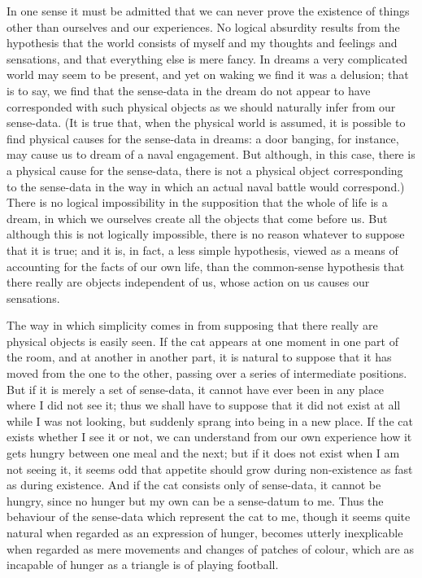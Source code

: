 \documentclass[oneside,letterpaper,12pt]{book}
\begin{document}
In one sense it must be admitted that we can never prove the existence
of things other than ourselves and our experiences. No logical absurdity
results from the hypothesis that the world consists of myself and my
thoughts and feelings and sensations, and that everything else is mere
fancy. In dreams a very complicated world may seem to be present, and
yet on waking we find it was a delusion; that is to say, we find that
the sense-data in the dream do not appear to have corresponded with such
physical objects as we should naturally infer from our sense-data. (It
is true that, when the physical world is assumed, it is possible to find
physical causes for the sense-data in dreams: a door banging, for
instance, may cause us to dream of a naval engagement. \label{navy} But although, in
this case, there is a physical cause for the sense-data, there is not a
physical object corresponding to the sense-data in the way in which an
actual naval battle would correspond.) There is no logical impossibility
in the supposition that the whole of life is a dream, in which we
ourselves create all the objects that come before us. But although this
is not logically impossible, there is no reason whatever to suppose that
it is true; and it is, in fact, a less simple hypothesis, viewed as a
means of accounting for the facts of our own life, than the common-sense
hypothesis that there really are objects independent of us, whose action
on us causes our sensations.

The way in which simplicity comes in from supposing that there really
are physical objects is easily seen. \label{kitty} If the cat appears at one moment in
one part of the room, and at another in another part, it is natural to
suppose that it has moved from the one to the other, passing over a
series of intermediate positions. But if it is merely a set of
sense-data, it cannot have ever been in any place where I did not see
it; thus we shall have to suppose that it did not exist at all while I
was not looking, but suddenly sprang into being in a new place. If the
cat exists whether I see it or not, we can understand from our own
experience how it gets hungry between one meal and the next; but if it
does not exist when I am not seeing it, it seems odd that appetite
should grow during non-existence as fast as during existence. And if the
cat consists only of sense-data, it cannot be hungry, since no hunger
but my own can be a sense-datum to me. Thus the behaviour of the
sense-data which represent the cat to me, though it seems quite natural
when regarded as an expression of hunger, becomes utterly inexplicable
when regarded as mere movements and changes of patches of colour, which
are as incapable of hunger as a triangle is of playing football.
\end{document}
